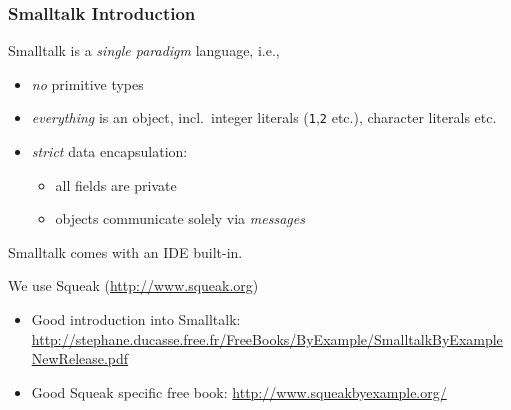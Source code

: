 \documentclass{beamer}
\begin{document}
\begin{frame}[fragile]
\frametitle{Smalltalk Introduction}

Smalltalk is a \emph{single paradigm} language, i.e.,
\begin{itemize}
  \item \emph{no} primitive types 
  \item \emph{everything} is an object, incl.\ integer
    literals (\texttt{1},\texttt{2} etc.), character literals etc.
  \item \emph{strict} data encapsulation:
    \begin{itemize}
    \item all fields are private
    \item objects communicate solely via \emph{messages}
    \end{itemize}
\end{itemize}

\bigskip\pause

Smalltalk comes with an IDE built-in.

\bigskip

We use Squeak (\url{http://www.squeak.org})

\begin{itemize}
  \item Good introduction into Smalltalk: \url{http://stephane.ducasse.free.fr/FreeBooks/ByExample/SmalltalkByExampleNewRelease.pdf}
  \item Good Squeak specific free book: \url{http://www.squeakbyexample.org/}
\end{itemize}

\end{frame}


\end{document}
